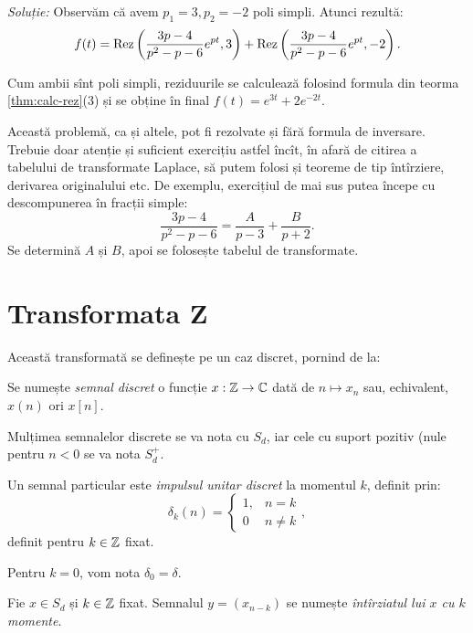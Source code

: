 \emph{Soluție:} Observăm că avem $ p_1 = 3, p_2 = -2 $ poli simpli.
Atunci rezultă:
\[
  f(t) = \Rez\left( \dfrac{3p - 4}{p^2 - p - 6} e^{pt}, 3\right) + %
  \Rez\left( \dfrac{3p - 4}{p^2 - p - 6} e^{pt}, -2 \right).
\]

Cum ambii sînt poli simpli, reziduurile se calculează folosind
formula din teorma \ref{thm:calc-rez}(3) și se obține în final
$ f(t) = e^{3t} + 2e^{-2t} $.

\begin{remark}\label{rk:no-mellin}
  Această problemă, ca și altele, pot fi rezolvate și fără formula de inversare.
  Trebuie doar atenție și suficient exercițiu astfel încît, în afară de citirea
   a tabelului de transformate Laplace, să putem folosi și teoreme
  de tip întîrziere, derivarea originalului etc. De exemplu, exercițiul de mai
  sus putea începe cu descompunerea în fracții simple:
  \[
    \dfrac{3p - 4}{p^2 - p - 6} = \dfrac{A}{p - 3} + \dfrac{B}{p + 2}.
  \]
  Se determină $ A $ și $ B $, apoi se folosește tabelul de transformate.
\end{remark}





\section{Transformata Z}

Această transformată se definește pe un caz discret, pornind de la:
\begin{definition}\label{def:semnal}
  Se numește \emph{semnal discret} o funcție $ x : \mathbb{Z} \to \mathbb{C} $ dată
  de $ n \mapsto x_n $ sau, echivalent, $ x(n) $ ori $ x[n] $.
\end{definition}

Mulțimea semnalelor discrete se va nota cu $ S_d $, iar cele cu suport pozitiv
(nule pentru $ n < 0 $ se va nota $ S_d^+ $.

Un semnal particular este \emph{impulsul unitar discret} la momentul $ k $,
definit prin:
\[
  \delta_k(n) = \begin{cases} 1, & n = k \\ 0 & n \neq k \end{cases},
\]
definit pentru $ k \in \mathbb{Z} $ fixat.

Pentru $ k = 0 $, vom nota $ \delta_0 = \delta $.

\begin{definition}\label{def:intirziat} 
  Fie $ x \in S_d $ și $ k \in \mathbb{Z} $ fixat. Semnalul $ y = (x_{n-k}) $ se numește
  \emph{întîrziatul lui $ x $ cu $ k $ momente}.
\end{definition}

